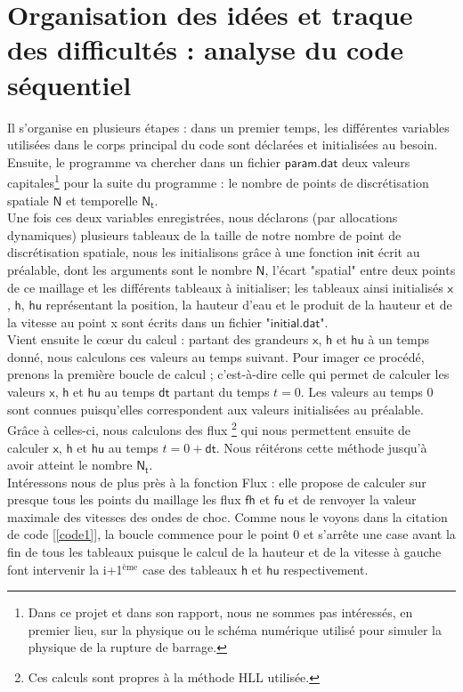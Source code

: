 \documentclass[french]{article}
\newcommand{\navy}{\color{navy}}
\newcommand{\bk}{\color{black}}
\newcommand{\cad}{c'est-à-dire}
\newcommand{\fhfu}{$\mathsf{fh}$ et $\mathsf{fu}$}
\begin{document}
\navy \section{Organisation des idées et traque des difficultés : analyse du code séquentiel } \bk

\noindent Il s'organise en plusieurs étapes : dans un premier temps, les différentes variables utilisées dans le corps principal du code sont déclarées et initialisées au besoin. Ensuite, le programme va chercher dans un fichier $\mathsf{param.dat}$ deux valeurs capitales\footnote{Dans ce projet et dans son rapport, nous ne sommes pas intéressés, en premier lieu, sur la physique ou le schéma numérique utilisé pour simuler la physique de la rupture de barrage.} pour la suite du programme : le nombre de points de discrétisation spatiale $\mathsf{N}$ et temporelle $\mathsf{N_t}$. \\

 Une fois ces deux variables enregistrées, nous déclarons (par allocations dynamiques) plusieurs tableaux de la taille de notre nombre de point de discrétisation spatiale, nous les initialisons grâce à une fonction $\mathsf{init}$ écrit au préalable, dont les arguments sont le nombre $\mathsf{N}$, l'écart "spatial" entre deux points de ce maillage et les différents tableaux à initialiser; les tableaux ainsi initialisés $\mathsf{x}$, $\mathsf{h}$, $\mathsf{hu}$ représentant la position, la hauteur d'eau et le produit de la hauteur et de la vitesse au point x sont écrits dans un fichier "$\mathsf{initial.dat}$".\\
Vient ensuite le cœur du calcul : partant des grandeurs $\mathsf{x}$, $\mathsf{h}$ et $\mathsf{hu}$ à un temps donné, nous calculons ces valeurs au temps suivant. Pour imager ce procédé, prenons la première boucle de calcul ; \cad $ $ celle qui permet de calculer les valeurs $\mathsf{x}$, $\mathsf{h}$ et $\mathsf{hu}$ au temps $\mathsf{dt}$ partant du temps $t = 0$. Les valeurs au temps $0$ sont connues puisqu'elles correspondent aux valeurs initialisées au préalable. Grâce à celles-ci, nous calculons des flux \footnote{Ces calculs sont propres à la méthode HLL utilisée.} qui nous permettent ensuite de calculer $\mathsf{x}$, $\mathsf{h}$ et $\mathsf{hu}$ au temps $t = 0 + \mathsf{dt}$. Nous réitérons cette méthode jusqu'à avoir atteint le nombre $\mathsf{N_t}$. \\

Intéressons nous de plus près à la fonction Flux : elle propose de calculer sur presque tous les points du maillage les flux \fhfu $ $ et de renvoyer la valeur maximale des vitesses des ondes de choc. Comme nous le voyons dans la citation de code [\ref{code1}], la boucle commence pour le point 0 et s'arrête une case avant la fin de tous les tableaux puisque le calcul de la hauteur et de la vitesse à gauche font intervenir la i+1$^{\text{ème}}$ case des tableaux $\mathsf{h}$ et $\mathsf{hu}$ respectivement. 
\end{document}
